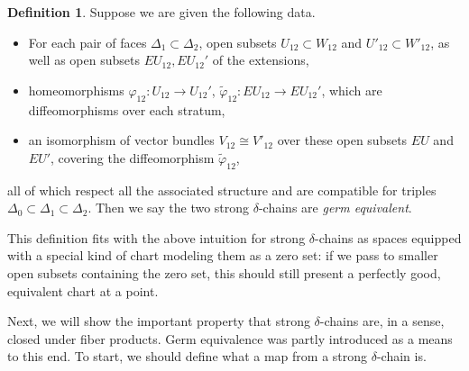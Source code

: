 \documentclass[10pt,a4paper]{amsart}
\theoremstyle{definition}
\newtheorem{definition}[theorem]{Definition}
\theoremstyle{remark}
\numberwithin{figure}{qchap}
\begin{document}
\begin{definition}Suppose we are given the following data. 
\begin{itemize}
\item For each pair of faces $\Delta_1 \subset \Delta_2$, open subsets $U_{12} \subset W_{12}$ and $U'_{12} \subset W'_{12}$, as well as open subsets $EU_{12}, EU_{12}'$ of the extensions, 
\item homeomorphisms $\varphi_{12}: U_{12} \to U_{12}'$, $\tilde \varphi_{12}: EU_{12} \to EU_{12}'$, which are diffeomorphisms over each stratum, 
\item an isomorphism of vector bundles $V_{12} \cong V'_{12}$ over these open subsets $EU$ and $EU'$, covering the diffeomorphism $\tilde \varphi_{12}$,
\end{itemize} 
all of which respect all the associated structure and are compatible for triples $\Delta_0 \subset \Delta_1 \subset \Delta_2$. Then we say the two strong $\delta$-chains are \emph{germ equivalent}.

\end{definition}

This definition fits with the above intuition for strong $\delta$-chains as spaces equipped with a special kind of chart modeling them as a zero set: if we pass to smaller open subsets containing the zero set, this should still present a perfectly good, equivalent chart at a point. 

Next, we will show the important property that strong $\delta$-chains are, in a sense, closed under fiber products. Germ equivalence was partly introduced as a means to this end. To start, we should define what a map from a strong $\delta$-chain is. 
\end{document}
